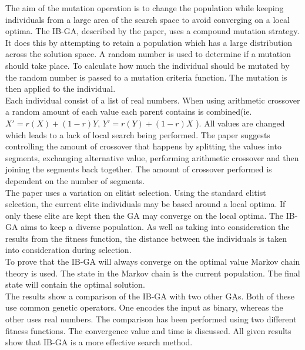 \documentclass[10pt,a4paper,openbib]{article}
\begin{document}
\begin{multicols}{2}
\noindent The aim of the mutation operation is to change the population while keeping individuals from a large area of the search space to avoid converging on a local optima. The IB-GA, described by the paper, uses a compound mutation strategy. It does this by attempting to retain a population which has a large distribution across the solution space. A random number is used to determine if a mutation should take place. To calculate how much the individual should be mutated by the random number is passed to a mutation criteria function. The mutation is then applied to the individual.\\

\noindent Each individual consist of a list of real numbers. When using arithmetic crossover a random amount of each value each parent contains is combined(ie. $X' = r(X) + (1 - r)Y$,  $Y' = r(Y) + (1 - r)X$ \cite{IB_GA}). All values are changed which leads to a lack of local search being performed. The paper suggests controlling the amount of crossover that happens by splitting the values into segments, exchanging alternative value, performing arithmetic crossover and then joining the segments back together. The amount of crossover performed is dependent on the number of segments. \\

\noindent The paper uses a variation on elitist selection. Using the standard elitist selection, the current elite individuals may be based around a local optima. If only these elite are kept then the GA may converge on the local optima. The IB-GA aims to keep a diverse population. As well as taking into consideration the results from the fitness function, the distance between the individuals is taken into consideration during selection. \\

\noindent To prove that the IB-GA will always converge on the optimal value Markov chain theory is used. The state in the Markov chain is the current population. The final state will contain the optimal solution. \cite{MarkovChainTheory}\\

\noindent The results show a comparison of the IB-GA with two other GAs. Both of these use common genetic operators. One encodes the input as binary, whereas the other uses real numbers. The comparison has been performed using two different fitness functions. The convergence value and time is discussed. All given results show that IB-GA is a more effective search method. 


\end{multicols}
\end{document}

